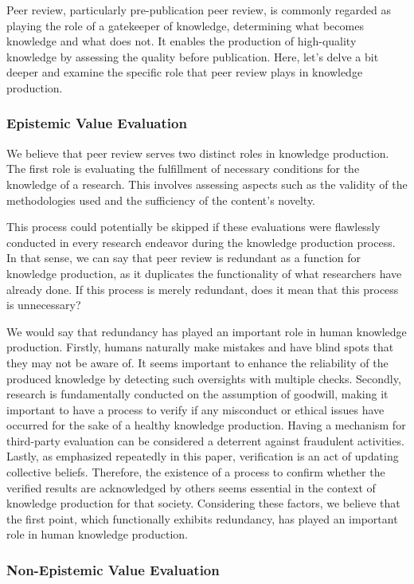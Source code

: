 Peer review, particularly pre-publication peer review, is commonly regarded as playing the role of a gatekeeper of knowledge, determining what becomes knowledge and what does not. It enables the production of high-quality knowledge by assessing the quality before publication. Here, let's delve a bit deeper and examine the specific role that peer review plays in knowledge production.

\subsubsection{Epistemic Value Evaluation}

We believe that peer review serves two distinct roles in knowledge production. The first role is evaluating the fulfillment of necessary conditions for the knowledge of a research. This involves assessing aspects such as the validity of the methodologies used and the sufficiency of the content's novelty. 

This process could potentially be skipped if these evaluations were flawlessly conducted in every research endeavor during the knowledge production process. In that sense, we can say that peer review is redundant as a function for knowledge production, as it duplicates the functionality of what researchers have already done. If this process is merely redundant, does it mean that this process is unnecessary?

We would say that redundancy has played an important role in human knowledge production. Firstly, humans naturally make mistakes and have blind spots that they may not be aware of. It seems important to enhance the reliability of the produced knowledge by detecting such oversights with multiple checks. Secondly, research is fundamentally conducted on the assumption of goodwill, making it important to have a process to verify if any misconduct or ethical issues have occurred for the sake of a healthy knowledge production. Having a mechanism for third-party evaluation can be considered a deterrent against fraudulent activities. Lastly, as emphasized repeatedly in this paper, verification is an act of updating collective beliefs. Therefore, the existence of a process to confirm whether the verified results are acknowledged by others seems essential in the context of knowledge production for that society. Considering these factors, we believe that the first point, which functionally exhibits redundancy, has played an important role in human knowledge production.

\subsubsection{Non-Epistemic Value Evaluation}

